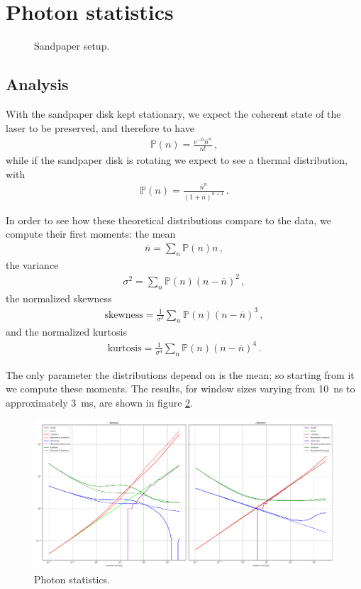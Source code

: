 \documentclass[main.tex]{subfiles}
\begin{document}
\section{Photon statistics}


\begin{figure}[ht]
\centering

\caption{Sandpaper setup.}
\label{fig:sandpaper}
\end{figure}

\subsection{Analysis}

With the sandpaper disk kept stationary, we expect the coherent state of the laser to be preserved, and therefore to have 
%
\begin{align}
\mathbb{P} (n) = \frac{e^{-\overline{n}} \overline{n}^{n}}{n!}
\,,
\end{align}
%
while if the sandpaper disk is rotating we expect to see a thermal distribution, with 
%
\begin{align}
\mathbb{P} (n) = \frac{\overline{n}^{n}}{(1 + \overline{n})^{n+1}}
\,.
\end{align}

In order to see how these theoretical distributions compare to the data, we compute their first moments: the mean 
%
\begin{align}
\overline{n} = \sum _{n} \mathbb{P}(n) n
\,,
\end{align}
%
the variance 
%
\begin{align}
\sigma^2 = \sum _{n} \mathbb{P}(n) (n - \overline{n})^2
\,,
\end{align}
%
the normalized skewness 
%
\begin{align}
\text{skewness} = \frac{1}{\sigma^3} \sum _{n} \mathbb{P}(n) (n - \overline{n})^3
\,,
\end{align}
%
and the normalized kurtosis 
%
\begin{align}
\text{kurtosis} = \frac{1}{\sigma^4} \sum _{n} \mathbb{P}(n) (n - \overline{n})^4
\,.
\end{align}

The only parameter the distributions depend on is the mean; so starting from it we compute these moments. 
The results, for window sizes varying from \SI{10}{ns} to approximately \SI{3}{ms}, are shown in figure \ref{fig:photon_statistics}.

\begin{figure}
    \includegraphics[width=\textwidth]{figures/photon_statistics.pdf}
    \caption{Photon statistics.}
    \label{fig:photon_statistics}
\end{figure}
\end{document}
